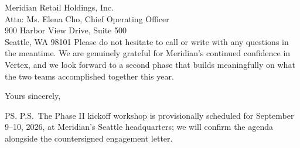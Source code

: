 \documentclass[a4paper,11pt,oneside,foldmarks,rightdate]{akletter}
\begin{document}
\begin{letter}{Meridian Retail Holdings, Inc.\\Attn: Ms. Elena Cho, Chief Operating Officer\\900 Harbor View Drive, Suite 500\\Seattle, WA 98101}
Please do not hesitate to call or write with any questions in the meantime. We are genuinely grateful for Meridian's continued confidence in Vertex, and we look forward to a second phase that builds meaningfully on what the two teams accomplished together this year.

\closing{Yours sincerely,}


\ps P.S.\ The Phase II kickoff workshop is provisionally scheduled for September 9--10, 2026, at Meridian's Seattle headquarters; we will confirm the agenda alongside the countersigned engagement letter.

\end{letter}
\end{document}

